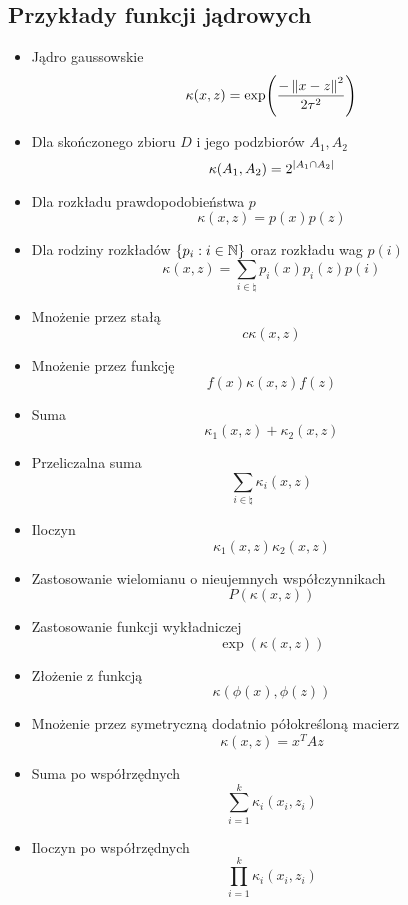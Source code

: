 \subsection{Przykłady funkcji jądrowych}
\begin{itemize}
	\item Jądro gaussowskie
	      \[
		      \kappa(x, z) = \exp\pars{\frac{-\norm{x - z}^2}{2\tau^2}}
	      \]
	\item Dla skończonego zbioru \( D \) i jego podzbiorów \( A_1, A_2 \)
	      \[
		      \kappa(A_1, A_2) = 2^{\card{A_1 \cap A_2}}
	      \]
	\item Dla rozkładu prawdopodobieństwa \( p \)
	      \[
		      \kappa(x, z) = p(x)p(z)
	      \]
	\item Dla rodziny rozkładów \( \set{p_i : i \in \natural} \) oraz rozkładu wag \( p(i) \)
	      \[
		      \kappa(x, z) = \sum_{i \in \natural} p_i(x)p_i(z)p(i)
	      \]
	\item Mnożenie przez stałą
	      \[
		      c\kappa(x, z)
	      \]
	\item Mnożenie przez funkcję
	      \[
		      f(x)\kappa(x, z)f(z)
	      \]
	\item Suma
	      \[
		      \kappa_1(x, z) + \kappa_2(x, z)
	      \]
	\item Przeliczalna suma
	      \[
		      \sum_{i \in \natural} \kappa_i(x, z)
	      \]
	\item Iloczyn
	      \[
		      \kappa_1(x, z) \kappa_2(x, z)
	      \]
	\item Zastosowanie wielomianu o nieujemnych współczynnikach
	      \[
		      P(\kappa(x, z))
	      \]
	\item Zastosowanie funkcji wykładniczej
	      \[
		      \exp(\kappa(x, z))
	      \]
	\item Złożenie z funkcją
	      \[
		      \kappa(\phi(x), \phi(z))
	      \]
	\item Mnożenie przez symetryczną dodatnio półokreśloną macierz
	      \[
		      \kappa(x, z) = x^TAz
	      \]
	\item Suma po współrzędnych
	      \[
		      \sum_{i=1}^k \kappa_i(x_i, z_i)
	      \]
	\item Iloczyn po współrzędnych
	      \[
		      \prod_{i=1}^k \kappa_i(x_i, z_i)
	      \]
\end{itemize}